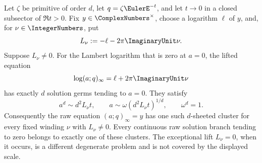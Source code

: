 \begin{proposition}
\label{prop:ip-cyclotomic-fixed-level}
Let \(\zeta\) be primitive of order \(d\), let
\(q=\zeta\EulerE^{-t}\), and let \(t\to0\) in a closed subsector of
\(\Re t>0\).  Fix \(y\in\ComplexNumbers^\times\), choose a logarithm
\(\ell\) of \(y\), and, for \(\nu\in\IntegerNumbers\), put
\[
 L_\nu:=-\ell-2\pi\ImaginaryUnit\nu.
\]
Suppose \(L_\nu\ne0\).  For the Lambert logarithm that is zero at \(a=0\),
the lifted equation
\[
 \log(a;q)_\infty=\ell+2\pi\ImaginaryUnit\nu
\]
has exactly \(d\) solution germs tending to \(a=0\).  They satisfy
\begin{equation}
 a^d\sim d^2L_\nu t,\qquad
 a\sim\omega(d^2L_\nu t)^{1/d},\qquad \omega^d=1.
 \label{eq:ip-cyclotomic-fixed-level}
\end{equation}
Consequently the raw equation \((a;q)_\infty=y\) has one such
\(d\)-sheeted cluster for every fixed winding \(\nu\) with \(L_\nu\ne0\).
Every continuous raw solution branch tending to zero belongs to exactly one
of these clusters.  The exceptional lift \(L_\nu=0\), when it occurs, is a
different degenerate problem and is not covered by the displayed scale.
\end{proposition}

